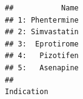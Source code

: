\documentclass[
]{book}
\begin{document}
\begin{verbatim}
##           Name
## 1: Phentermine
## 2: Simvastatin
## 3:  Eprotirome
## 4:   Pizotifen
## 5:   Asenapine
##                                                                                                                                                                                                                                                                                                                                                                                                                                                                                                                                                                                                                                                                                                                                                                                                                                                                                                                                                                                                                                                                                                                                                                                                                                                                                                                                                                                                                                                                                                                                                                                                                                                                                                                                                                                                                     Indication

\end{verbatim}
\end{document}
